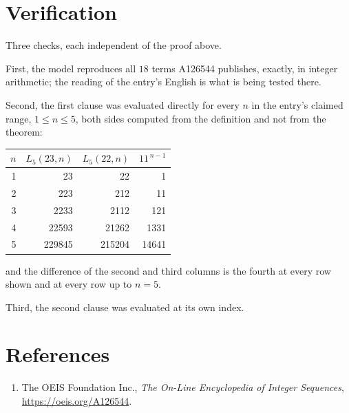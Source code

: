 \documentclass[11pt,a4paper]{article}
\theoremstyle{plain}
\theoremstyle{definition}
\begin{document}
\section{Verification}

Three checks, each independent of the proof above.

First, the model reproduces all $18$ terms A126544 publishes, exactly, in integer
arithmetic; the reading of the entry's English is what is being tested there.

Second, the first clause was evaluated directly for every $n$ in the entry's claimed range,
$1\le n\le5$, both sides computed from the definition and not from the theorem:

\begin{center}
\begin{tabular}{rrrr}
$n$ & $L_{5}(23,n)$ & $L_{5}(22,n)$ & $11^{\,n-1}$ \\ \hline
1 & 23 & 22 & 1 \\
2 & 223 & 212 & 11 \\
3 & 2233 & 2112 & 121 \\
4 & 22593 & 21262 & 1331 \\
5 & 229845 & 215204 & 14641 \\
\end{tabular}
\end{center}

\noindent and the difference of the second and third columns is the fourth at every row shown
and at every row up to $n=5$.

Third, the second clause was evaluated at its own index.

\section*{References}
\begin{enumerate}
\item The OEIS Foundation Inc., \emph{The On-Line Encyclopedia of Integer Sequences},
\url{https://oeis.org/A126544}.
\end{enumerate}
\end{document}
